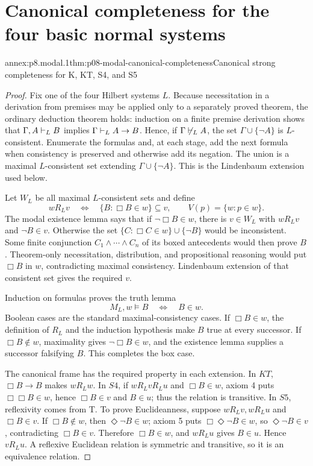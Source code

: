 \section{Canonical completeness for the four basic normal systems}

\begin{annexitem}{annex:p8.modal.1}{thm:p08-modal-canonical-completeness}{Canonical strong completeness for K, KT, S4, and S5}
\begin{proof}
Fix one of the four Hilbert systems \(L\).  Because necessitation in a
derivation from premises may be applied only to a separately proved theorem,
the ordinary deduction theorem holds: induction on a finite premise derivation
shows that \(\Gamma,A\vdash_L B\) implies
\(\Gamma\vdash_L A\to B\).  Hence, if
\(\Gamma\not\vdash_L A\), the set
\(\Gamma\cup\{\neg A\}\) is \(L\)-consistent.  Enumerate the formulas and,
at each stage, add the next formula when consistency is preserved and otherwise
add its negation.  The union is a maximal \(L\)-consistent set extending
\(\Gamma\cup\{\neg A\}\).  This is the Lindenbaum extension used below.

Let \(W_L\) be all maximal \(L\)-consistent sets and define
\[
 wR_Lv
 \quad\Longleftrightarrow\quad
 \{B:\Box B\in w\}\subseteq v,
 \qquad
 V(p)=\{w:p\in w\}.
\]
The modal existence lemma says that if \(\neg\Box B\in w\), there is
\(v\in W_L\) with \(wR_Lv\) and \(\neg B\in v\).  Otherwise the set
\(\{C:\Box C\in w\}\cup\{\neg B\}\) would be inconsistent.  Some finite
conjunction \(C_1\land\cdots\land C_n\) of its boxed antecedents would then
prove \(B\).  Theorem-only necessitation, distribution, and propositional
reasoning would put \(\Box B\) in \(w\), contradicting maximal consistency.
Lindenbaum extension of that consistent set gives the required \(v\).

Induction on formulas proves the truth lemma
\[
 M_L,w\models B\quad\Longleftrightarrow\quad B\in w.
\]
Boolean cases are the standard maximal-consistency cases.  If \(\Box B\in w\),
the definition of \(R_L\) and the induction hypothesis make \(B\) true at
every successor.  If \(\Box B\notin w\), maximality gives
\(\neg\Box B\in w\), and the existence lemma supplies a successor falsifying
\(B\).  This completes the box case.

The canonical frame has the required property in each extension.  In \(KT\),
\(\Box B\to B\) makes \(wR_Lw\).  In \(S4\), if
\(wR_LvR_Lu\) and \(\Box B\in w\), axiom 4 puts
\(\Box\Box B\in w\), hence \(\Box B\in v\) and \(B\in u\); thus the
relation is transitive.  In \(S5\), reflexivity comes from T.  To prove
Euclideanness, suppose \(wR_Lv,wR_Lu\) and \(\Box B\in v\).  If
\(\Box B\notin w\), then \(\Diamond\neg B\in w\); axiom 5 puts
\(\Box\Diamond\neg B\in w\), so \(\Diamond\neg B\in v\), contradicting
\(\Box B\in v\).  Therefore \(\Box B\in w\), and \(wR_Lu\) gives
\(B\in u\).  Hence \(vR_Lu\).  A reflexive Euclidean relation is symmetric
and transitive, so it is an equivalence relation.


\end{proof}
\end{annexitem}
